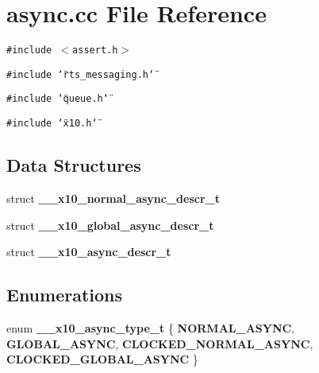 \section{async.cc File Reference}
\label{async_8cc}
{\tt \#include $<$assert.h$>$}\par
{\tt \#include \char`\"{}rts\_\-messaging.h\char`\"{}}\par
{\tt \#include \char`\"{}queue.h\char`\"{}}\par
{\tt \#include \char`\"{}x10.h\char`\"{}}\par
\subsection*{Data Structures}
\begin{CompactItemize}
\item 
struct {\bf \_\-\_\-x10\_\-normal\_\-async\_\-descr\_\-t}
\item 
struct {\bf \_\-\_\-x10\_\-global\_\-async\_\-descr\_\-t}
\item 
struct {\bf \_\-\_\-x10\_\-async\_\-descr\_\-t}
\end{CompactItemize}
\subsection*{Enumerations}
\begin{CompactItemize}
\item 
enum {\bf \_\-\_\-x10\_\-async\_\-type\_\-t} \{ {\bf NORMAL\_\-ASYNC}, 
{\bf GLOBAL\_\-ASYNC}, 
{\bf CLOCKED\_\-NORMAL\_\-ASYNC}, 
{\bf CLOCKED\_\-GLOBAL\_\-ASYNC}
 \}
\end{CompactItemize}
